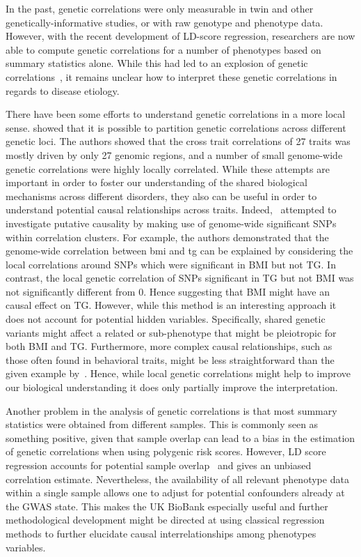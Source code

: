 In the past, genetic correlations were only measurable in twin and other genetically-informative studies, or with  raw genotype and phenotype data.
However, with the recent development of LD-score regression, researchers are now able to compute genetic correlations for     a number of phenotypes based on summary statistics alone.
While this had led to an explosion of genetic correlations~\cite{Bulik-Sullivan2015b,Bulik-Sullivan2015a}, it remains unclear how to interpret these genetic correlations in regards to disease etiology.

There have been some efforts to understand genetic correlations in a more local sense.
\citet{Shi2016a} showed that it is possible to partition genetic correlations across different genetic loci.
The authors showed that the cross trait correlations of 27 traits was mostly driven by only 27 genomic regions, and a number of small genome-wide genetic correlations were highly locally correlated.
While these attempts are important in order to foster our understanding of the shared biological mechanisms across different disorders, they also can be useful in order to understand potential causal relationships across traits.
Indeed,~\citet{Shi2016a} attempted to investigate putative causality by making use of genome-wide significant SNPs within correlation clusters.
For example, the authors demonstrated that the genome-wide correlation between \acrfull{bmi} and \acrfull{tg} can be explained by considering the local correlations around SNPs which were significant in BMI but not TG\@.
In contrast, the local genetic correlation of SNPs significant in TG  but not BMI was not significantly different from $0$.
Hence suggesting that BMI might have an causal effect on TG\@.
However, while this method is an interesting approach it does not account for potential hidden variables.
Specifically, shared genetic variants might affect a related or sub-phenotype that might be pleiotropic for both BMI and TG\@.
Furthermore, more complex causal relationships, such as those often found in behavioral traits, might be less straightforward than the given example by~\citet{Shi2016a}.
Hence, while local genetic correlations might help to improve our biological understanding it does only partially improve the interpretation.

Another problem in the analysis of genetic correlations is that most summary statistics were obtained from different samples.
This is commonly seen as something positive, given that sample overlap can lead to a bias in the estimation of genetic correlations when using polygenic risk scores. 
However, LD score regression accounts for potential sample overlap~\cite{Bulik-Sullivan2015a} and gives an unbiased correlation estimate.  
Nevertheless, the availability of all relevant phenotype data within a single sample allows one to adjust for potential confounders already at the GWAS state.
This makes the UK BioBank especially useful and further methodological development might be directed at using classical regression methods to further elucidate causal interrelationships among phenotypes variables.

